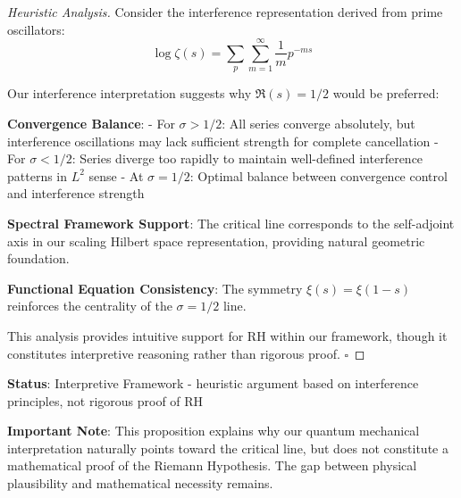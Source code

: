 \documentclass[12pt]{article}
\theoremstyle{plain}
\theoremstyle{definition}
\begin{document}
\begin{proof}[Heuristic Analysis]
Consider the interference representation derived from prime oscillators:
$$\log \zeta(s) = \sum_{p}\sum_{m=1}^{\infty} \frac{1}{m} p^{-ms}$$

Our interference interpretation suggests why $\Re(s) = 1/2$ would be preferred:

\textbf{Convergence Balance}:
- For $\sigma > 1/2$: All series converge absolutely, but interference oscillations may lack sufficient strength for complete cancellation
- For $\sigma < 1/2$: Series diverge too rapidly to maintain well-defined interference patterns in $L^2$ sense
- At $\sigma = 1/2$: Optimal balance between convergence control and interference strength

\textbf{Spectral Framework Support}: The critical line corresponds to the self-adjoint axis in our scaling Hilbert space representation, providing natural geometric foundation.

\textbf{Functional Equation Consistency}: The symmetry $\xi(s) = \xi(1-s)$ reinforces the centrality of the $\sigma = 1/2$ line.

This analysis provides intuitive support for RH within our framework, though it constitutes interpretive reasoning rather than rigorous proof. $\square$
\end{proof}

\textbf{Status}: Interpretive Framework - heuristic argument based on interference principles, not rigorous proof of RH

\textbf{Important Note}: This proposition explains why our quantum mechanical interpretation naturally points toward the critical line, but does not constitute a mathematical proof of the Riemann Hypothesis. The gap between physical plausibility and mathematical necessity remains.
\end{document}
